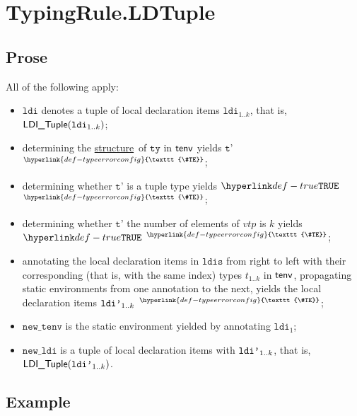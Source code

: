 \documentclass{book}
\newcommand\TypeErrorConfig[0]{\hyperlink{def-typeerrorconfig}{\texttt{\#TE}}}
\newcommand\ProseOrTypeError[0]{\hyperlink{def-proseortypeerror}{$^{\TypeErrorConfig}$}}
\newcommand\structure[0]{\hyperlink{def-structure}{structure}}
\newcommand\newtenv[0]{\texttt{new\_tenv}}
\newcommand\ldi[0]{\texttt{ldi}}
\newcommand\tty[0]{\texttt{ty}}
\newcommand\ldis[0]{\texttt{ldis}}
\newcommand\newldi[0]{\texttt{new\_ldi}}
\newcommand\vtp[0]{\texttt{t'}}
\begin{document}
\section{TypingRule.LDTuple\label{sec:TypingRule.LDTuple}}

\subsection{Prose}
All of the following apply:
\begin{itemize}
  \item $\ldi$ denotes a tuple of local declaration items $\ldi_{1..k}$, that is, $\LDITuple(\ldi_{1..k})$;
  \item determining the \structure\ of $\tty$ in $\textsf{tenv}$ yields $\vtp$ \ProseOrTypeError;
  \item determining whether $\vtp$ is a tuple type yields $\True$ \ProseOrTypeError;
  \item determining whether $\vtp$ the number of elements of $vtp$ is $k$ yields $\True$ \ProseOrTypeError;
  \item annotating the local declaration items in $\ldis$ from right to left with their corresponding
        (that is, with the same index) types $t_{1..k}$ in $\textsf{tenv}$,
        propagating static environments from one annotation to the next,
        yields the local declaration items $\texttt{ldi'}_{1..k}$ \ProseOrTypeError;
  \item $\newtenv$ is the static environment yielded by annotating $\ldi_1$;
  \item $\newldi$ is a tuple of local declaration items with $\texttt{ldi'}_{1..k}$, that is, \\
        $\textsf{LDI\_Tuple}(\texttt{ldi'}_{1..k})$.
\end{itemize}

\subsection{Example}

\end{document}
